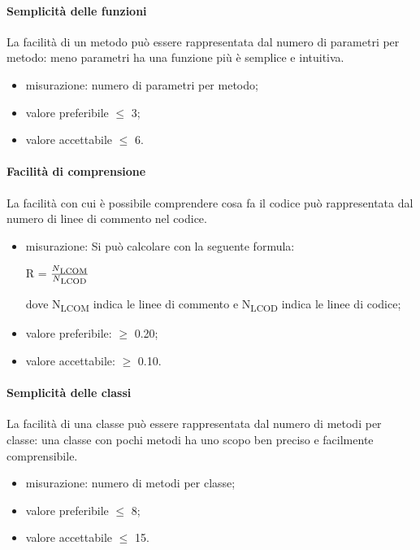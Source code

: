 \paragraph{Semplicità delle funzioni}
La facilità di un metodo può essere rappresentata dal numero di parametri per metodo: meno parametri ha una funzione più è semplice e intuitiva.
	\begin{itemize}
		\item misurazione: numero di parametri per metodo;
		\item valore preferibile $\leq$ 3;
		\item valore accettabile $\leq$ 6.
	\end{itemize}

\paragraph{Facilità di comprensione}
La facilità con cui è possibile comprendere cosa fa il codice può rappresentata dal numero di linee di commento nel codice.
	\begin{itemize}
	    \item misurazione: Si può calcolare con la seguente formula: \\
		\centerline{R = \(\frac{N\textsubscript{LCOM}}{N\textsubscript{LCOD}} \) }
			dove N\textsubscript{LCOM} indica le linee di commento e N\textsubscript{LCOD} indica le linee di codice;
		\item valore preferibile: $\geq$ 0.20;
		\item valore accettabile: $\geq$ 0.10.
	\end{itemize}

\paragraph{Semplicità delle classi}
La facilità di una classe può essere rappresentata dal numero di metodi per classe: una classe con pochi metodi ha uno scopo ben preciso e facilmente comprensibile.
	\begin{itemize}
		\item misurazione: numero di metodi per classe;
		\item valore preferibile $\leq$ 8;
		\item valore accettabile $\leq$ 15.
	\end{itemize}